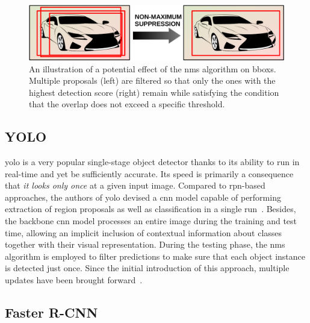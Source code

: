 \begin{figure}[t]
    \centerline{\includegraphics[width=0.6\linewidth]{figures/theoretical_foundations/non_maximum_suppression.pdf}}
    \caption[\gls{nms} visualization]{An illustration of a potential effect of the \gls{nms} algorithm on \glspl{bbox}. Multiple proposals (left) are filtered so that only the ones with the highest detection score (right) remain while satisfying the condition that the overlap does not exceed a specific threshold.}
    \label{fig:NonMaximumSuppression}
\end{figure}

\subsection{YOLO}
\label{ssec:YouLookOnlyOnce}

\gls{yolo} is a very popular single-stage object detector thanks to its ability to run in real-time and yet be sufficiently accurate. Its speed is primarily a consequence that \emph{it looks only once} at a given input image. Compared to \gls{rpn}-based approaches, the authors of \gls{yolo} devised a \gls{cnn} model capable of performing extraction of region proposals as well as classification in a single run~\cite{redmon2016yolo}. Besides, the backbone \gls{cnn} model processes an entire image during the training and test time, allowing an implicit inclusion of contextual information about classes together with their visual representation. During the testing phase, the \gls{nms} algorithm is employed to filter predictions to make sure that each object instance is detected just once. Since the initial introduction of this approach, multiple updates have been brought forward~\cite{redmon2017yolo9000, redmon2018yolov3, wang2020yolov4, wong2019yolonano}.

\subsection{Faster R-CNN}
\label{ssec:FasterRCNN}

